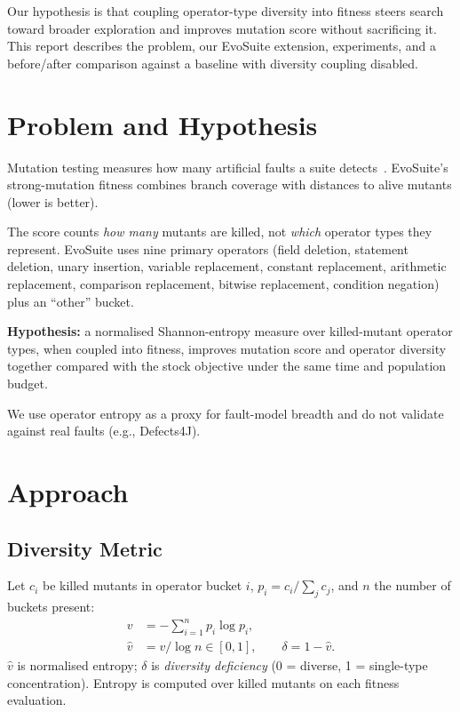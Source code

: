 \documentclass{IEEEtran}
\begin{document}
Our hypothesis is that coupling operator-type diversity into fitness steers search toward broader exploration and improves mutation score without sacrificing it.
This report describes the problem, our EvoSuite extension, experiments, and a before/after comparison against a baseline with diversity coupling disabled.

\section{Problem and Hypothesis}

Mutation testing measures how many artificial faults a suite detects~\cite{papadakis2019mutation}.
EvoSuite's strong-mutation fitness combines branch coverage with distances to alive mutants (lower is better).

The score counts \emph{how many} mutants are killed, not \emph{which} operator types they represent.
EvoSuite uses nine primary operators (field deletion, statement deletion, unary insertion, variable replacement, constant replacement, arithmetic replacement, comparison replacement, bitwise replacement, condition negation) plus an ``other'' bucket.

\textbf{Hypothesis:} a normalised Shannon-entropy measure over killed-mutant operator types, when coupled into fitness, improves mutation score and operator diversity together compared with the stock objective under the same time and population budget.

We use operator entropy as a proxy for fault-model breadth and do not validate against real faults (e.g., Defects4J).

\section{Approach}

\subsection{Diversity Metric}

Let $c_i$ be killed mutants in operator bucket $i$, $p_i = c_i / \sum_j c_j$, and $n$ the number of buckets present:
\begin{align}
v &= -\textstyle\sum_{i=1}^{n} p_i \log p_i, \label{eq:entropy-a}\\
\hat{v} &= v / \log n \in [0,1], \qquad \delta = 1 - \hat{v}. \label{eq:entropy-b}
\end{align}
$\hat{v}$ is normalised entropy; $\delta$ is \emph{diversity deficiency} (0 = diverse, 1 = single-type concentration).
Entropy is computed over killed mutants on each fitness evaluation.
\end{document}
